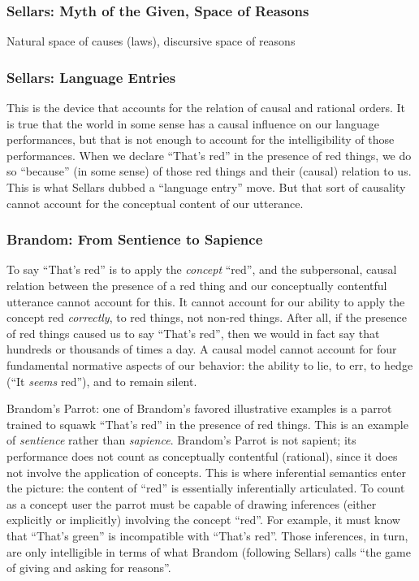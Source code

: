 \documentclass[11pt,twoside]{article}
\begin{document}
\subsubsection{Sellars: Myth of the Given, Space of Reasons}


Natural space of causes (laws), discursive space of reasons

\subsubsection{Sellars: Language Entries}

This is the device that accounts for the relation of causal and
rational orders.  It is true that the world in some sense has a causal
influence on our language performances, but that is not enough to
account for the intelligibility of those performances.  When we
declare ``That's red'' in the presence of red things, we do so
``because'' (in some sense) of those red things and their (causal)
relation to us.  This is what Sellars dubbed a ``language entry''
move.  But that sort of causality cannot account for the conceptual
content of our utterance.

\subsubsection{Brandom: From Sentience to Sapience}

To say ``That's red'' is to apply the \textit{concept} ``red'', and
the subpersonal, causal relation between the presence of a red thing
and our conceptually contentful utterance cannot account for this.  It
cannot account for our ability to apply the concept red
\textit{correctly}, to red things, not non-red things.  After all, if
the presence of red things caused us to say ``That's red'', then we
would in fact say that hundreds or thousands of times a day.  A causal
model cannot account for four fundamental normative aspects of our
behavior: the ability to lie, to err, to hedge (``It \textit{seems}
red''), and to remain silent.

Brandom's Parrot: one of Brandom's favored illustrative examples is a
parrot trained to squawk ``That's red'' in the presence of red things.
This is an example of \textit{sentience} rather than
\textit{sapience}.  Brandom's Parrot is not sapient; its performance
does not count as conceptually contentful (rational), since it does
not involve the application of concepts.  This is where inferential
semantics enter the picture: the content of ``red'' is essentially
inferentially articulated.  To count as a concept user the parrot must
be capable of drawing inferences (either explicitly or implicitly)
involving the concept ``red''.  For example, it must know that
``That's green'' is incompatible with ``That's red''.  Those
inferences, in turn, are only intelligible in terms of what Brandom
(following Sellars) calls ``the game of giving and asking for
reasons''.
\end{document}
